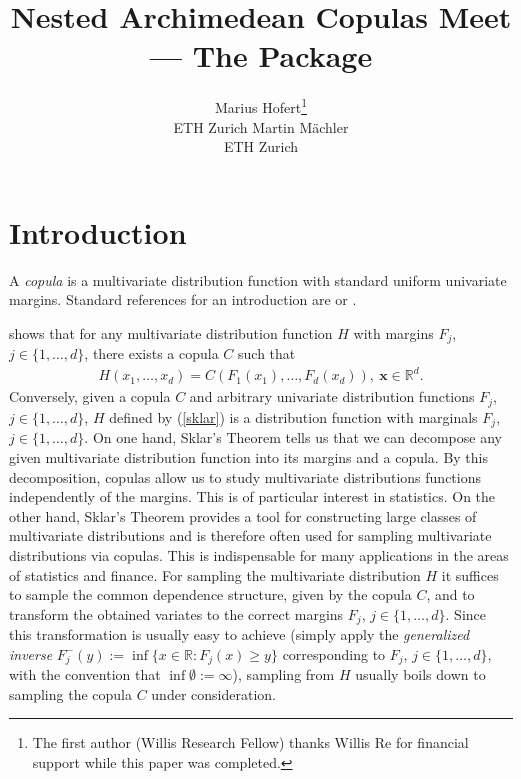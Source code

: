 \documentclass[nojss,article]{jss}
\author{Marius Hofert\thanks{The first author (Willis Research Fellow) thanks
Willis Re for financial support while this paper was completed.} \\ETH Zurich
 \And
 Martin M\"achler \\ ETH Zurich}
\title{Nested Archimedean Copulas Meet \R --- The \pkg{nacopula} Package}
\theoremstyle{mythmstyle}
\newcommand*{\IR}{\mathbb{R}}
\begin{document}
\section{Introduction}
A \textit{copula} is a multivariate distribution function with standard
uniform univariate margins. Standard references for an introduction
are \citet{joe1997} or \citet{nelsen2007}.

\citet{sklar1959} shows that for any multivariate
distribution function $H$ with margins $F_j$, $j\in\{1,\dots,d\}$, there exists
a copula $C$ such that
\begin{align}
	H(x_1,\dots,x_d)=C(F_1(x_1),\dots,F_d(x_d)),\ \bm{x}\in\IR^d.\label{sklar}
\end{align}
Conversely, given a copula $C$ and arbitrary univariate distribution functions $F_j$,
$j\in\{1,\dots,d\}$, $H$ defined by (\ref{sklar}) is a distribution function
with marginals $F_j$, $j\in\{1,\dots,d\}$. On one hand, Sklar's Theorem
tells us that we can decompose any given multivariate distribution function into
its margins and a copula. By this decomposition, copulas allow us to study
multivariate distributions functions independently of the margins. This is of
particular interest in statistics. On the other hand, Sklar's Theorem provides a
tool for constructing large classes of multivariate distributions and is
therefore often used for sampling multivariate distributions via
copulas. This is indispensable for
many applications in the areas of statistics and finance. For sampling the
multivariate distribution $H$ it suffices to sample the common dependence
structure, given by the copula $C$, and to transform the obtained variates to
the correct margins $F_j$, $j\in\{1,\dots,d\}$. Since this transformation is
usually easy to achieve (simply apply the \textit{generalized inverse}
$F_j^-(y):=\inf\{x\in\IR:F_j(x)\ge y\}$ corresponding to $F_j$,
$j\in\{1,\dots,d\}$, with the convention that $\inf\emptyset:=\infty$), sampling
from $H$ usually boils down to sampling the copula $C$ under consideration.
\end{document}

